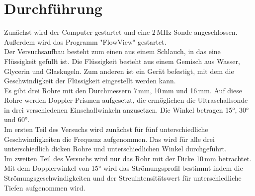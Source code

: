 \section{Durchführung}
Zunächst wird der Computer gestartet und eine 2\,MHz Sonde angeschlossen.
Außerdem wird das Programm "FlowView" gestartet.\\
Der Versuchsaufbau besteht zum einen aus einem Schlauch, in das eine Flüssigkeit gefüllt ist.
Die Flüssigkeit besteht aus einem Gemisch aus Wasser, Glycerin und Glaskugeln.
Zum anderen ist ein Gerät befestigt, mit dem die Geschwindigkeit der Flüssigkeit eingestellt werden kann.\\
Es gibt drei Rohre mit den Durchmessern 7\,mm, 10\,mm und 16\,mm.
Auf diese Rohre werden Doppler-Prismen aufgesetzt,
die ermöglichen die Ultraschallsonde in drei verschiedenen Einschallwinkeln anzusetzen.
Die Winkel betragen 15°, 30° und 60°.\\
Im ersten Teil des Versuchs wird zunächst für fünf unterschiedliche Geschwindigkeiten die Frequenz aufgenommen.
Das wird für alle drei unterschiedlich dicken Rohre und unterschiedlichen Winkel durchgeführt.\\
Im zweiten Teil des Versuchs wird nur das Rohr mit der Dicke 10\,mm betrachtet.
Mit dem Dopplerwinkel von 15° wird das Strömungsprofil bestimmt indem die Strömungsgeschwindigkeiten
und der Streuintensitätswert für unterschiedliche Tiefen aufgenommen wird.
